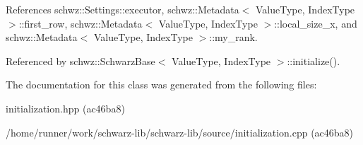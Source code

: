 References schwz\+::\+Settings\+::executor, schwz\+::\+Metadata$<$ Value\+Type, Index\+Type $>$\+::first\+\_\+row, schwz\+::\+Metadata$<$ Value\+Type, Index\+Type $>$\+::local\+\_\+size\+\_\+x, and schwz\+::\+Metadata$<$ Value\+Type, Index\+Type $>$\+::my\+\_\+rank.



Referenced by schwz\+::\+Schwarz\+Base$<$ Value\+Type, Index\+Type $>$\+::initialize().



The documentation for this class was generated from the following files\+:\begin{DoxyCompactItemize}
\item 
initialization.\+hpp (ac46ba8)\item 
/home/runner/work/schwarz-\/lib/schwarz-\/lib/source/initialization.\+cpp (ac46ba8)\end{DoxyCompactItemize}
